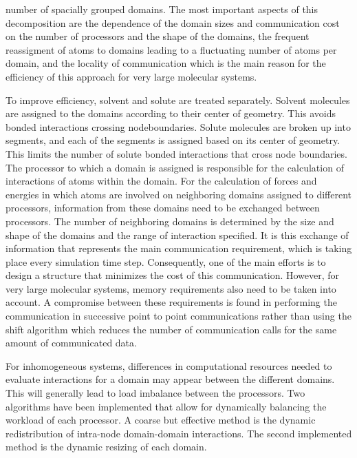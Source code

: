 number of spacially grouped domains.
The most important aspects of this decomposition
are the dependence of the domain sizes and communication cost on
the number of processors and the shape of the domains, the
frequent reassigment of atoms to domains leading to a fluctuating
number of atoms per domain, and the locality of communication
which is the main reason for the efficiency of this approach for
very large molecular systems.
\par
To improve efficiency, solvent and solute are treated separately.
Solvent molecules are assigned to the domains according to their
center of geometry. This avoids bonded interactions crossing nodeboundaries.
Solute molecules are broken up into segments, and each of the segments
is assigned based on its center of geometry. This limits the number
of solute bonded interactions that cross node boundaries.
The processor to which a domain is assigned is responsible for
the calculation of interactions of atoms within the domain.
For the  calculation of forces and energies in which atoms are involved
on neighboring domains assigned to different processors, information
from these domains need to be exchanged between processors. The
number of neighboring domains is determined by the size and shape
of the domains and the range of interaction specified. It is this exchange
of information that represents the main communication requirement, which
is taking place every simulation time step. Consequently, one of the
main efforts is to design a structure that minimizes the cost of this
communication. However, for very large molecular systems, memory
requirements also need to be taken into account. A compromise between
these requirements is found in performing the communication in
successive point to point communications rather than using the
shift algorithm which reduces the number of communication calls
for the same amount of communicated data.
\par
For inhomogeneous systems, differences in computational resources needed
to evaluate interactions for a domain may appear between the different
domains. This will generally lead to load imbalance between the processors.
Two algorithms have been implemented that allow for dynamically balancing
the workload of each processor. A coarse but effective method is the
dynamic redistribution of intra-node domain-domain interactions. The
second implemented method is the dynamic resizing of each domain.
